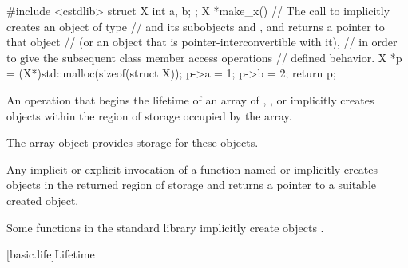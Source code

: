 \pnum
\begin{example}
\begin{codeblock}
#include <cstdlib>
struct X { int a, b; };
X *make_x() {
  // The call to  implicitly creates an object of type 
  // and its subobjects  and , and returns a pointer to that  object
  // (or an object that is pointer-interconvertible with it),
  // in order to give the subsequent class member access operations
  // defined behavior.
  X *p = (X*)std::malloc(sizeof(struct X));
  p->a = 1;
  p->b = 2;
  return p;
}
\end{codeblock}
\end{example}

\pnum
An operation that begins the lifetime of
an array of , , or 
implicitly creates objects within the region of storage occupied by the array.
\begin{note}
The array object provides storage for these objects.
\end{note}
Any implicit or explicit invocation of a function
named  or 
implicitly creates objects in the returned region of storage and
returns a pointer to a suitable created object.
\begin{note}
Some functions in the \Cpp{} standard library implicitly create objects%
.
\end{note}

[basic.life]{Lifetime}

